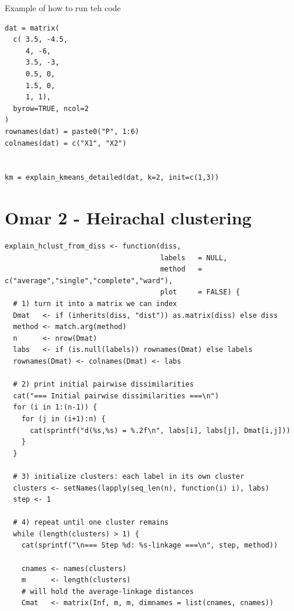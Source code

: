 \documentclass{article}
\begin{document}
Example of how to run teh code
\begin{lstlisting}
dat = matrix(
  c( 3.5, -4.5,
     4, -6,
     3.5, -3,
     0.5, 0,
     1.5, 0,
     1, 1),
  byrow=TRUE, ncol=2
)
rownames(dat) = paste0("P", 1:6)
colnames(dat) = c("X1", "X2")


km = explain_kmeans_detailed(dat, k=2, init=c(1,3))
\end{lstlisting}



\pagebreak

\section{Omar 2 - Heirachal clustering}

\begin{lstlisting}
explain_hclust_from_diss <- function(diss,
                                     labels   = NULL,
                                     method   = c("average","single","complete","ward"),
                                     plot     = FALSE) {
  # 1) turn it into a matrix we can index
  Dmat   <- if (inherits(diss, "dist")) as.matrix(diss) else diss
  method <- match.arg(method)
  n      <- nrow(Dmat)
  labs   <- if (is.null(labels)) rownames(Dmat) else labels
  rownames(Dmat) <- colnames(Dmat) <- labs

  # 2) print initial pairwise dissimilarities
  cat("=== Initial pairwise dissimilarities ===\n")
  for (i in 1:(n-1)) {
    for (j in (i+1):n) {
      cat(sprintf("d(%s,%s) = %.2f\n", labs[i], labs[j], Dmat[i,j]))
    }
  }

  # 3) initialize clusters: each label in its own cluster
  clusters <- setNames(lapply(seq_len(n), function(i) i), labs)
  step <- 1

  # 4) repeat until one cluster remains
  while (length(clusters) > 1) {
    cat(sprintf("\n=== Step %d: %s-linkage ===\n", step, method))

    cnames <- names(clusters)
    m      <- length(clusters)
    # will hold the average-linkage distances
    Cmat   <- matrix(Inf, m, m, dimnames = list(cnames, cnames))


\end{lstlisting}
\end{document}

